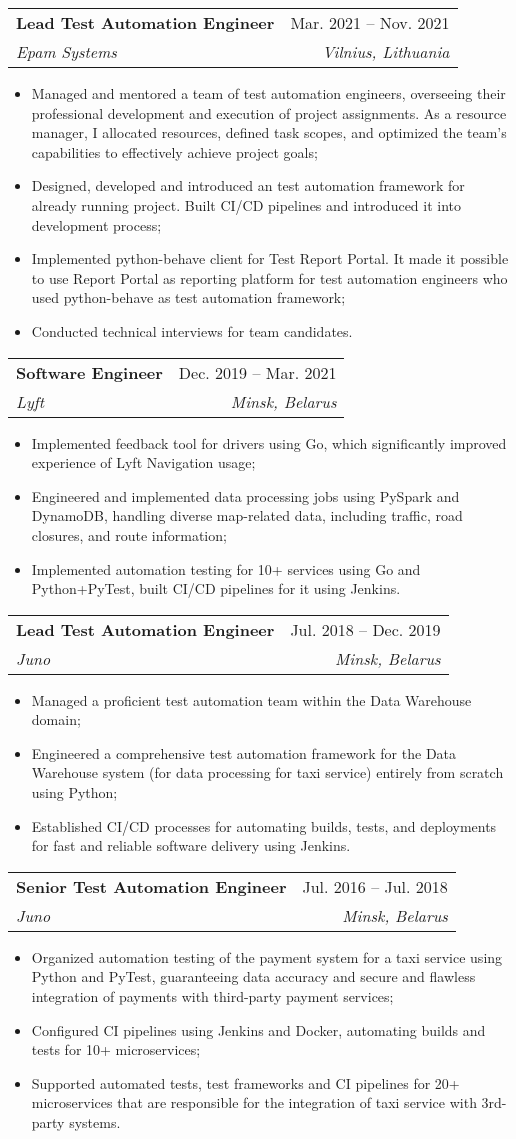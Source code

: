 \documentclass[letterpaper,11pt]{article}
\makeatletter
\newcommand{\resumeItem}[1]{
    \item\small{
        \begin{minipage}[t]{0.99\linewidth} %
        {#1}
        \end{minipage}
        \vspace{1pt} %
    }
}
\newcommand{\resumeSubheading}[4]{
    \vspace{-2pt}\item
    \begin{tabular*}{0.97\textwidth}[t]{l@{\extracolsep{\fill}}r}
        \textbf{#1} & #2 \\
        \textit{\small#3} & \textit{\small #4} \\
    \end{tabular*}\vspace{-7pt}
}
\newcommand{\resumeItemListStart}{\begin{itemize}}
\newcommand{\resumeItemListEnd}{\end{itemize}\vspace{-5pt}}
\makeatother
\begin{document}
\resumeSubheading
{Lead Test Automation Engineer}{Mar. 2021 -- Nov. 2021}
{Epam Systems}{Vilnius, Lithuania}
\resumeItemListStart
\resumeItem{Managed and mentored a team of test automation engineers, overseeing their professional development and execution of project assignments. As a resource manager, I allocated resources, defined task scopes, and optimized the team's capabilities to effectively achieve project goals;}
\resumeItem{Designed, developed and introduced an test automation framework for already running project. Built CI/CD pipelines and introduced it into development process;}
\resumeItem{Implemented python-behave client for Test Report Portal. It made it possible to use Report Portal as reporting platform for test automation engineers who used python-behave as test automation framework;}
\resumeItem{Conducted technical interviews for team candidates.}
\resumeItemListEnd

\resumeSubheading
{Software Engineer}{Dec. 2019 -- Mar. 2021}
{Lyft}{Minsk, Belarus}
\resumeItemListStart
\resumeItem{Implemented feedback tool for drivers using Go, which significantly improved experience of Lyft Navigation usage;}
\resumeItem{Engineered and implemented data processing jobs using PySpark and DynamoDB, handling diverse map-related data, including traffic, road closures, and route information;}
\resumeItem{Implemented automation testing for 10+ services using Go and Python+PyTest, built CI/CD pipelines for it using Jenkins.}
\resumeItemListEnd

\resumeSubheading
{Lead Test Automation Engineer}{Jul. 2018 -- Dec. 2019}
{Juno}{Minsk, Belarus}
\resumeItemListStart
\resumeItem{Managed a proficient test automation team within the Data Warehouse domain;}
\resumeItem{Engineered a comprehensive test automation framework for the Data Warehouse system (for data processing for taxi service) entirely from scratch using Python;}
\resumeItem{ Established CI/CD processes for automating builds, tests, and deployments for fast and reliable software delivery using Jenkins.}
\resumeItemListEnd

\resumeSubheading
{Senior Test Automation Engineer}{Jul. 2016 -- Jul. 2018}
{Juno}{Minsk, Belarus}
\resumeItemListStart
\resumeItem{Organized automation testing of the payment system for a taxi service using Python and PyTest, guaranteeing data accuracy and secure and flawless integration of payments with third-party payment services;}
\resumeItem{Configured CI pipelines using Jenkins and Docker, automating builds and tests for 10+ microservices;}
\resumeItem{ Supported automated tests, test frameworks and CI pipelines for 20+ microservices that are responsible for the integration of taxi service with 3rd-party systems. }
\resumeItemListEnd
\end{document}
